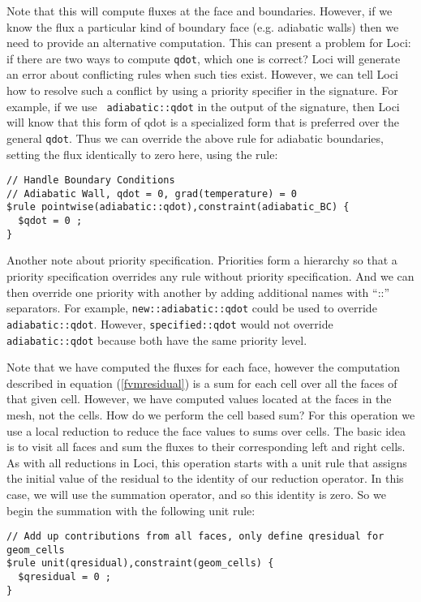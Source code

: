 \documentclass[10pt,epsf,letterpaper,twoside]{book}
\begin{document}
Note that this will compute fluxes at the face and boundaries.
However, if we know the flux a particular kind of boundary face
(e.g. adiabatic walls) then we need to provide an alternative
computation.  This can present a problem for Loci: if there are two
ways to compute {\tt qdot}, which one is correct?  Loci will generate
an error about conflicting rules when such ties exist.  However, we
can tell Loci how to resolve such a conflict by using a priority
specifier in the signature.  For example, if we use {\tt
  adiabatic::qdot} in the output of the signature, then Loci will know
that this form of qdot is a specialized form that is preferred over the
general {\tt qdot}.  Thus we can override the above rule for adiabatic
boundaries, setting the flux identically to zero here, using the rule:
\begin{verbatim}
// Handle Boundary Conditions
// Adiabatic Wall, qdot = 0, grad(temperature) = 0
$rule pointwise(adiabatic::qdot),constraint(adiabatic_BC) {
  $qdot = 0 ;
}
\end{verbatim}
Another note about priority specification.  Priorities form a
hierarchy so that a priority specification overrides any rule without
priority specification.  And we can then override one priority with
another by adding additional names with ``::'' separators.  For
example, {\tt new::adiabatic::qdot} could be used to override
{\tt adiabatic::qdot}.  However, {\tt specified::qdot} would not override
{\tt adiabatic::qdot} because both have the same priority level.

Note that we have computed the fluxes for each face, however the
computation described in equation (\ref{fvmresidual}) is a sum for
each cell over all the faces of that given cell.  However, we have
computed values located at the faces in the mesh, not the cells.  How
do we perform the cell based sum?  For this operation we use a local
reduction to reduce the face values to sums over cells.  The basic
idea is to visit all faces and sum the fluxes to their corresponding
left and right cells.  As with all reductions in Loci, this operation
starts with a unit rule that assigns the initial value of the residual
to the identity of our reduction operator.  In this case, we will use
the summation operator, and so this identity is zero.  So we begin the
summation with the following unit rule:
\begin{verbatim}
// Add up contributions from all faces, only define qresidual for geom_cells
$rule unit(qresidual),constraint(geom_cells) {
  $qresidual = 0 ;
}
\end{verbatim}
\end{document}
